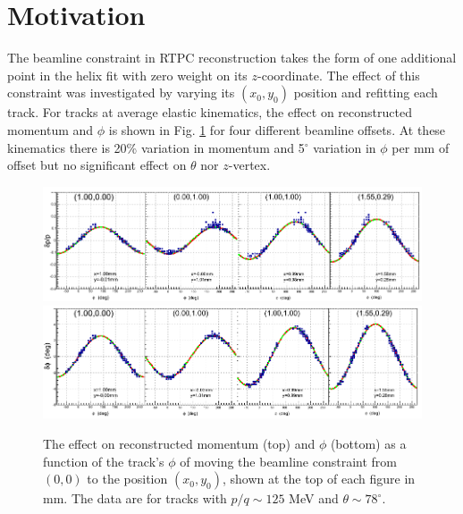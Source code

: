 \documentclass[amsmath,amssymb,notitlepage,12pt]{revtex4-1}
\begin{document}
\section{Motivation}\label{sec:motivation}
The beamline constraint in RTPC reconstruction takes the form of one additional point in the helix fit with zero weight on its $z$-coordinate.  The effect of this constraint was investigated by varying its $(x_0,y_0)$ position and refitting each track.  For tracks at average elastic kinematics, the effect on reconstructed momentum and $\phi$ is shown in Fig. \ref{fig:example_phi} for four different beamline offsets.   At these kinematics there is 20\% variation in momentum and 5$^\circ$ variation in $\phi$ per mm of offset but no significant effect on $\theta$ nor $z$-vertex.%

\begin{figure}[btp]\centering
    \includegraphics[width=16cm]{pics/offsets_phi}
    \includegraphics[width=16cm]{pics/offsets_mom}
    \caption{The effect on reconstructed momentum (top) and $\phi$ (bottom) as a function of the track's $\phi$ of moving the beamline constraint from $(0,0)$ to the position $(x_0,y_0)$, shown at the top of each figure in mm.  The data are for tracks with $p/q\sim125$ MeV and $\theta\sim78^\circ$.\label{fig:example_phi}}
\end{figure}
\end{document}
